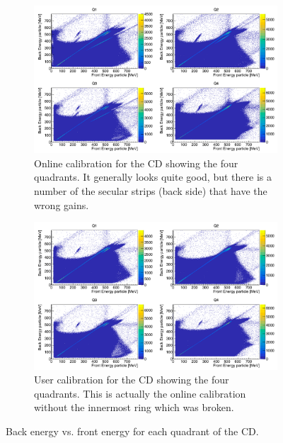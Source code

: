 \documentclass[twoside,english]{uiofysmaster/uiofysmaster}
\begin{document}
\begin{figure}[ht]
	\centering
	\begin{subfigure}{\textwidth}
		\centering
		\includegraphics[width=\textwidth]{../Plots/plotting/E_f_b_Q1-4-online.png}
		\caption{Online calibration for the CD showing the four quadrants. It generally looks quite good, but there is a number of the secular strips (back side) that have the wrong gains.}
		\label{fig:cal_online}
	\end{subfigure}
	\begin{subfigure}{\textwidth}
		\centering
		\includegraphics[width=\textwidth]{../Plots/plotting/E_f_b_Q1-4-user.png}
		\caption{User calibration for the CD showing the four quadrants. This is actually the online calibration without the innermost ring which was broken.}
		\label{fig:cal_user}
	\end{subfigure}
	\caption{Back energy vs. front energy for each quadrant of the CD.}
	\label{fig:cal_OU}
\end{figure}
\end{document}
